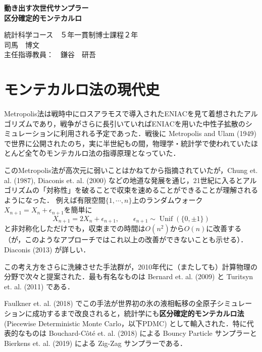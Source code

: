 \documentclass[leqno,a4j]{jarticle}
\numberwithin{equation}{section}
\begin{document}
\normalsize

\begin{center}

\textbf{\huge{動き出す次世代サンプラー\\区分確定的モンテカルロ}}
\vspace{0.5cm}

\large{統計科学コース　５年一貫制博士課程２年\\

司馬　博文
\vspace{0.2cm}\\ 
\normalsize{主任指導教員：　鎌谷　研吾}

}

\end{center}


\section{モンテカルロ法の現代史}

Metropolis法は戦時中にロスアラモスで導入されたENIACを見て着想されたアルゴリズムであり，戦争がさらに長引いていればENIACを用いた中性子拡散のシミュレーションに利用される予定であった．戦後に Metropolis and Ulam (1949) で世界に公開されたのち，実に半世紀もの間，物理学・統計学で使われていたほとんど\.{全}\.{て}のモンテカルロ法の指導原理となっていた．

このMetropolis法が高次元に弱いことはかねてから指摘されていたが，Chung et. al. (1987), Diaconis et. al. (2000) などの地道な発展を通じ，21世紀に入るとアルゴリズムの「対称性」を破ることで収束を速めることができることが理解されるようになった．
例えば有限空間$\{1,\cdots,n\}$上のランダムウォーク$X_{n+1}=X_n+\epsilon_{n+1}$を簡単に
\[X_{n+1}=2X_n+\epsilon_{n+1},\qquad\epsilon_{n+1}\sim\operatorname{Unif}(\{0,\pm1\})\]
と非対称化しただけでも，収束までの時間は$O(n^2)$から$O(n)$に改善する（が，このようなアプローチではこれ以上の改善ができないことも示せる）．Diaconis (2013) が詳しい．

この考え方をさらに洗練させた手法群が，2010年代に（またしても）計算物理の分野で次々と提案された．最も有名なものは Bernard et. al. (2009) と Turitsyn et. al. (2011) である．

Faulkner et. al. (2018) でこの手法が世界初の氷の液相転移の全原子シミュレーションに成功するまで改良されると，統計学にも\textbf{区分確定的モンテカルロ法} (Piecewise Deterministic Monte Carlo，以下PDMC) として輸入された．特に代表的なものは Bouchard-Côté et. al. (2018) による Bouncy Particle サンプラーと Bierkens et. al. (2019) による Zig-Zag サンプラーである．
\end{document}

